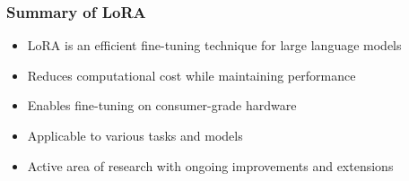 \begin{frame}[fragile]\frametitle{Summary of LoRA}

\begin{itemize}
    \item LoRA is an efficient fine-tuning technique for large language models
    \item Reduces computational cost while maintaining performance
    \item Enables fine-tuning on consumer-grade hardware
    \item Applicable to various tasks and models
    \item Active area of research with ongoing improvements and extensions
\end{itemize}
\end{frame}


